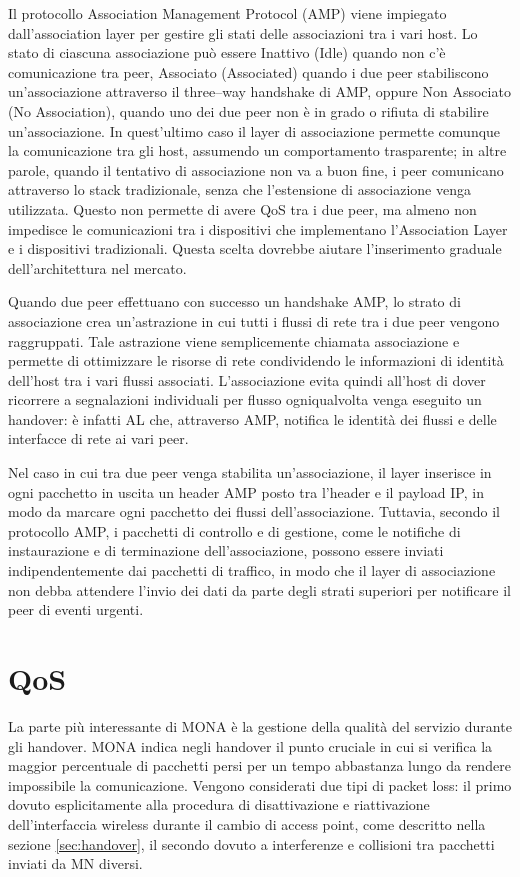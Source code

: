 \documentclass[12pt,a4paper,openright,twoside]{book}
\begin{document}
Il protocollo Association Management Protocol (AMP) viene impiegato
dall'association layer per gestire gli stati delle associazioni tra i
vari host. Lo stato di ciascuna associazione può essere Inattivo
(Idle) quando non c'è comunicazione tra peer, Associato (Associated)
quando i due peer stabiliscono un'associazione attraverso il
three--way handshake di AMP, oppure Non Associato (No Association),
quando uno dei due peer non è in grado o rifiuta di stabilire
un'associazione. In quest'ultimo caso il layer di associazione
permette comunque la comunicazione tra gli host, assumendo un
comportamento trasparente; in altre parole, quando il tentativo di
associazione non va a buon fine, i peer comunicano attraverso lo stack
tradizionale, senza che l'estensione di associazione venga
utilizzata. Questo non permette di avere QoS tra i due peer, ma almeno
non impedisce le comunicazioni tra i dispositivi che implementano
l'Association Layer e i dispositivi tradizionali. Questa scelta
dovrebbe aiutare l'inserimento graduale dell'architettura nel mercato.

Quando due peer effettuano con successo un handshake AMP, lo strato di
associazione crea un'astrazione in cui tutti i flussi di rete tra i
due peer vengono raggruppati. Tale astrazione viene semplicemente
chiamata associazione e permette di ottimizzare le risorse di rete
condividendo le informazioni di identità dell'host tra i vari flussi
associati. L'associazione evita quindi all'host di dover ricorrere a
segnalazioni individuali per flusso ogniqualvolta venga eseguito un
handover: è infatti AL che, attraverso AMP, notifica le identità dei
flussi e delle interfacce di rete ai vari peer.

Nel caso in cui tra due peer venga stabilita un'associazione, il layer
inserisce in ogni pacchetto in uscita un header AMP posto tra l'header
e il payload IP, in modo da marcare ogni pacchetto dei flussi
dell'associazione. Tuttavia, secondo il protocollo AMP, i pacchetti di
controllo e di gestione, come le notifiche di instaurazione e di
terminazione dell'associazione, possono essere inviati
indipendentemente dai pacchetti di traffico, in modo che il layer di
associazione non debba attendere l'invio dei dati da parte degli
strati superiori per notificare il peer di eventi urgenti.

\section{QoS}
\label{sec:mona:qos}

La parte più interessante di MONA è la gestione della qualità del
servizio durante gli handover. MONA indica negli handover il punto
cruciale in cui si verifica la maggior percentuale di pacchetti persi
per un tempo abbastanza lungo da rendere impossibile la
comunicazione. Vengono considerati due tipi di packet loss: il primo
dovuto esplicitamente alla procedura di disattivazione e riattivazione
dell'interfaccia wireless durante il cambio di access point, come
descritto nella sezione \ref{sec:handover}, il secondo dovuto a
interferenze e collisioni tra pacchetti inviati da MN diversi.
\end{document}
